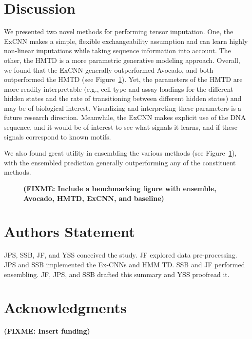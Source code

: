 \documentclass[11pt]{article}
\def\fixme#1{\textbf{(FIXME: #1)}}
\begin{document}
\section{Discussion}
We presented two novel methods for performing tensor imputation. One, the ExCNN makes a simple, flexible exchangeability assumption and can learn highly non-linear imputations while taking sequence information into account. The other, the HMTD is a more parametric generative modeling approach. Overall, we found that the ExCNN generally outperformed Avocado, and both outperformed the HMTD (see Figure~\ref{fig:bench}). Yet, the parameters of the HMTD are more readily interpretable (e.g., cell-type and assay loadings for the different hidden states and the rate of transitioning between different hidden states) and may be of biological interest. Visualizing and interpreting these parameters is a future research direction. Meanwhile, the ExCNN makes explicit use of the DNA sequence, and it would be of interest to see what signals it learns, and if these signals correspond to known motifs.

We also found great utility in ensembling the various methods (see Figure~\ref{fig:bench}), with the ensembled prediction generally outperforming any of the constituent methods.

\begin{figure}
\caption{\fixme{Include a benchmarking figure with ensemble, Avocado, HMTD, ExCNN, and baseline}}
\label{fig:bench}
\end{figure}




\section{Authors Statement}
JPS, SSB, JF, and YSS conceived the study. JF explored data pre-processing. JPS and SSB implemented the Ex-CNNs and HMM TD. SSB and JF performed ensembling. JF, JPS, and SSB drafted this summary and YSS proofread it.

\section{Acknowledgments}
\fixme{Insert funding}
\end{document}

